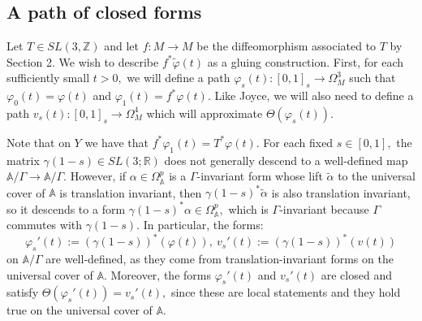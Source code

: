 \documentclass{amsart}
\theoremstyle{theorem}
\theoremstyle{definition}
\theoremstyle{definition}
\theoremstyle{definition}
\theoremstyle{theorem}
\theoremstyle{theorem}
\theoremstyle{theorem}
\theoremstyle{corollary}
\theoremstyle{question}
\theoremstyle{remark}
\begin{document}
\subsection{A path of closed forms}

Let $T\in SL(3, \mathbb{Z})$ and let $f: M\to M$ be the diffeomorphism associated to $T$ by Section 2. We wish to describe $f^*\widetilde\varphi(t)$ as a gluing construction. First, for each sufficiently small $t>0,$ we will define a path $\varphi_s(t):[0,1]_s\to \Omega^3_M$ such that $\varphi_0(t) = \varphi(t)$ and $\varphi_1(t) = f^*\varphi(t).$ Like Joyce, we will also need to define a path $v_s(t):[0,1]_s\to\Omega^4_M$ which will approximate $\Theta(\varphi_s(t))$.

Note that on $Y$ we have that $f^*\varphi_1(t) = T^*\varphi(t).$ For each fixed $s\in[0,1],$ the matrix $\gamma(1-s)\in SL(3;\mathbb{R})$ does not generally descend to a well-defined map $\mathbb{A}/\Gamma\to\mathbb{A}/\Gamma.$ However, if $\alpha \in \Omega^p_\mathbb{A}$ is a $\Gamma$-invariant form whose lift $\widetilde{\alpha}$ to the universal cover of $\mathbb{A}$ is translation invariant, then $\gamma(1-s)^*\widetilde{\alpha}$ is also translation invariant, so it descends to a form $\gamma(1-s)^*\alpha\in \Omega^p_\mathbb{A},$ which is $\Gamma$-invariant because $\Gamma$ commutes with $\gamma(1-s).$ In particular, the forms: $$\varphi_{s}'(t) := {\left(\gamma(1-s)\right)^*}(\varphi(t)),~ v_s'(t) := {\left(\gamma(1-s)\right)^*}(v(t))$$ on $\mathbb{A}/\Gamma$ are well-defined, as they come from translation-invariant forms on the universal cover of $\mathbb{A}.$ Moreover, the forms $\varphi_s'(t)$ and $v_s'(t)$ are closed and satisfy $\Theta(\varphi_s'(t))=v_s'(t),$ since these are local statements and they hold true on the universal cover of $\mathbb{A}$.
\end{document}
